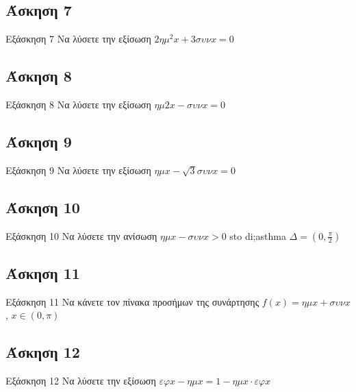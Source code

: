 \documentclass[greek]{beamer}
\begin{document}
\subsection{Άσκηση 7}
\begin{frame}[label=Άσκηση]{Εξάσκηση 7}
 Να λύσετε την εξίσωση $2ημ^2x+3συνx=0$

\end{frame}

\subsection{Άσκηση 8}
\begin{frame}[label=Άσκηση8]{Εξάσκηση 8}
 Να λύσετε την εξίσωση $ημ2x-συνx=0$

\end{frame}

\subsection{Άσκηση 9}
\begin{frame}[label=Άσκηση9]{Εξάσκηση 9}
 Να λύσετε την εξίσωση $ημx-\sqrt{3}συνx=0$

\end{frame}

\subsection{Άσκηση 10}
\begin{frame}[label=Άσκηση10]{Εξάσκηση 10}
 Να λύσετε την ανίσωση $ημx-συνx>0$ sto di;asthma $Δ=(0,\frac{π}{2})$

\end{frame}

\subsection{Άσκηση 11}
\begin{frame}[label=Άσκηση11]{Εξάσκηση 11}
 Να κάνετε τον πίνακα προσήμων της συνάρτησης $f(x)=ημx+συνx$, $x\in (0,π)$

\end{frame}

\subsection{Άσκηση 12}
\begin{frame}[label=Άσκηση12]{Εξάσκηση 12}
 Να λύσετε την εξίσωση $εφx-ημx=1-ημx\cdot εφx$

\end{frame}
\end{document}
